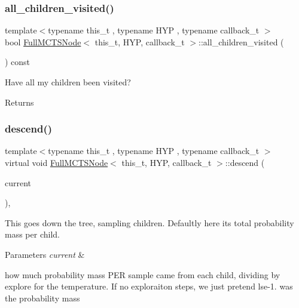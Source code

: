 \subsubsection{\texorpdfstring{all\+\_\+children\+\_\+visited()}{all\_children\_visited()}}
{\footnotesize\ttfamily template$<$typename this\+\_\+t , typename H\+YP , typename callback\+\_\+t $>$ \\
bool \hyperlink{class_full_m_c_t_s_node}{Full\+M\+C\+T\+S\+Node}$<$ this\+\_\+t, H\+YP, callback\+\_\+t $>$\+::all\+\_\+children\+\_\+visited (\begin{DoxyParamCaption}{ }\end{DoxyParamCaption}) const\hspace{0.3cm}{\ttfamily [inline]}}



Have all my children been visited? 

\begin{DoxyReturn}{Returns}

\end{DoxyReturn}
\mbox{\label{class_full_m_c_t_s_node_ab5cf544f500703c9b8b46892a961ec32}} 
\subsubsection{\texorpdfstring{descend()}{descend()}}
{\footnotesize\ttfamily template$<$typename this\+\_\+t , typename H\+YP , typename callback\+\_\+t $>$ \\
virtual void \hyperlink{class_full_m_c_t_s_node}{Full\+M\+C\+T\+S\+Node}$<$ this\+\_\+t, H\+YP, callback\+\_\+t $>$\+::descend (\begin{DoxyParamCaption}\item[{H\+YP \&}]{current }\end{DoxyParamCaption})\hspace{0.3cm}{\ttfamily [inline]}, {\ttfamily [virtual]}}



This goes down the tree, sampling children. Defaultly here it\textquotesingle{}s total probability mass per child. 


\begin{DoxyParams}{Parameters}
{\em current} & \\
\hline
\end{DoxyParams}
how much probability mass P\+ER sample came from each child, dividing by explore for the temperature. If no exploraiton steps, we just pretend lse-\/1. was the probability mass \mbox{\label{class_full_m_c_t_s_node_aac59f75931712d329f0b2142d786d03a}} 
